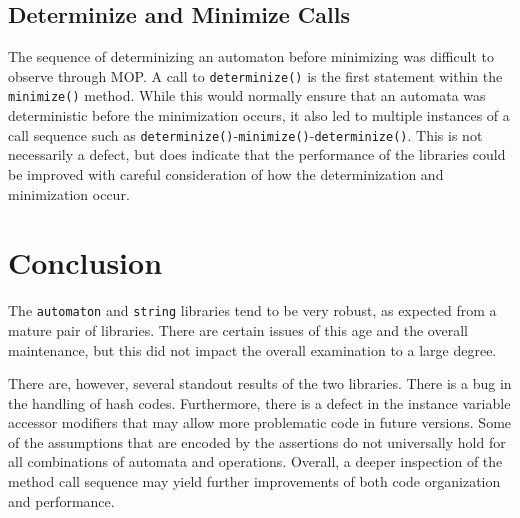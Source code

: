 \documentclass[letterpaper,sigplan]{acmart}
\begin{document}
\subsection{Determinize and Minimize Calls}%
\label{sec:results-determinize-minimize}

The sequence of determinizing an automaton before minimizing was difficult to
observe through MOP\@.  A call to \lstinline{determinize()} is the first
statement within the \lstinline{minimize()} method.  While this would normally
ensure that an automata was deterministic before the minimization occurs, it
also led to multiple instances of a call sequence such as
\lstinline{determinize()}-\lstinline{minimize()}-\lstinline{determinize()}.
This is not necessarily a defect, but does indicate that the performance of the
libraries could be improved with careful consideration of how the
determinization and minimization occur.

\section{Conclusion}

The \lstinline{automaton} and \lstinline{string} libraries tend to be very
robust, as expected from a mature pair of libraries.  There are certain issues
of this age and the overall maintenance, but this did not impact the overall
examination to a large degree.

There are, however, several standout results of the two libraries.  There is a
bug in the handling of hash codes.  Furthermore, there is a defect in the
instance variable accessor modifiers that may allow more problematic code in
future versions.  Some of the assumptions that are encoded by the assertions do
not universally hold for all combinations of automata and operations.  Overall,
a deeper inspection of the method call sequence may yield further improvements
of both code organization and performance.



\end{document}
